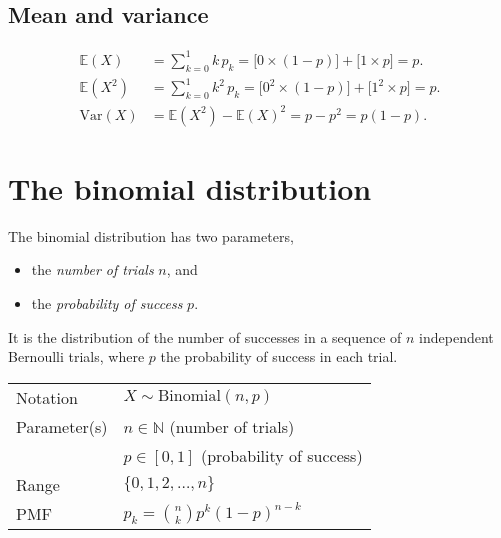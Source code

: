 \documentclass[lecture]{csm}
\newcommand{\expe}{\mathbb{E}}
\newcommand{\var}{\text{Var}}
\def\it{\item}
\def\bit{\begin{itemize}}
\def\eit{\end{itemize}}
\begin{document}
\subsection*{Mean and variance}
\begin{align*}
\expe(X) 
	& 	= \sum_{k=0}^1 k\,p_k
	 	= \big[0\times(1-p)\big] + \big[1\times p\big]
		= p. \\
\expe(X^2) 
	& 	= \sum_{k=0}^1 k^2\,p_k
		= \big[0^2\times(1-p)\big] + \big[1^2\times p\big]
		= p. \\
\var(X)	
	& 	= \expe(X^2)-\expe(X)^2
		= p - p^2
		= p(1-p).
\end{align*}


\section{The binomial distribution}

The binomial distribution has two parameters, 
\bit
\it the \emph{number of trials} $n$, and 
\it the \emph{probability of success} $p$. 
\eit
It is the distribution of the number of successes in a sequence of $n$ independent Bernoulli trials, where $p$ the probability of success in each trial.

\begin{center}
\begin{tabular}{ll}\hline
Notation			& $X\sim\text{Binomial}(n,p)$ \\
Parameter(s)		& $n \in\mathbb{N}$ \qquad (number of trials) \\
				& $p \in[0,1]$ \quad (probability of success) \\
Range			& $\{0,1,2,\ldots,n\}$ \\
PMF				& $p_k = \displaystyle\binom{n}{k}p^k(1-p)^{n-k}$\\[2ex] \hline
\end{tabular}
\end{center}

\newpage
\end{document}
